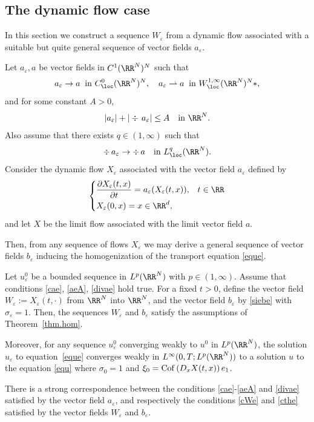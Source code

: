 \subsection{The dynamic flow case}\label{ss.flow}
In this section we construct a sequence $W_\varepsilon$ from a dynamic flow associated with a suitable but quite general sequence of vector fields $a_\varepsilon$.

Let $a_\varepsilon,a$ be vector fields in $C^1(\RR^N)^N$ such that
\begin{equation}\label{cae}
a_\varepsilon \to a\;\;\mbox{in }C^0_\loc(\RR^N)^N,\quad a_\varepsilon\rightharpoonup a\;\;\mbox{in }W^{1,\infty}_\loc(\RR^N)^N\ast,
\end{equation}
and for some constant $A>0$,
\begin{equation}\label{aeA}
|a_\varepsilon|+|\div\,a_\varepsilon|\leq A\quad\mbox{in }\RR^N.
\end{equation}
Also assume that there exists $q\in(1,\infty)$ such that
\begin{equation}\label{divae}
\div\,a_\varepsilon\to \div\,a\quad\mbox{in }L^q_\loc(\RR^N).
\end{equation}
Consider the dynamic flow $X_\varepsilon$ associated with the vector field $a_\varepsilon$ defined by
\begin{equation}\label{Xeae}
\begin{cases}
\dfrac{\partial X_\varepsilon(t,x)}{\partial t}=a_\varepsilon(X_\varepsilon(t,x)), & t\in\RR
\\[5pt]
X_\varepsilon(0,x)=x\in\RR^d,
\end{cases}
\end{equation}
and let $X$ be the limit flow associated with the limit vector field $a$.

Then, from any sequence of flows $X_\varepsilon$ we may derive a general sequence of vector fields $b_\varepsilon$ inducing the homogenization of the transport equation \eqref{eque}.
\begin{Pro}\label{pro.ae}
Let $u_\varepsilon^0$ be a bounded sequence in $L^p(\RR^N)$ with $p\in(1,\infty)$.
Assume that conditions \eqref{cae}, \eqref{aeA}, \eqref{divae} hold true. For a fixed $t>0$, define the vector field $W_\varepsilon:=X_\varepsilon(t,\cdot)$ from $\RR^N$ into $\RR^N$, and the vector field $b_\varepsilon$ by \eqref{siebe} with $\sigma_\varepsilon=1$. Then, the sequences $W_\varepsilon$ and $b_\varepsilon$ satisfy the assumptions of Theorem~\ref{thm.hom}.

Moreover, for any sequence $u_\varepsilon^0$ converging weakly to $u^0$ in $L^p(\RR^N)$, the solution $u_\varepsilon$ to equation~\eqref{eque} converges weakly in $L^\infty(0,T;L^p(\RR^N))$ to a solution $u$ to the equation \eqref{equ} where $\sigma_0=1$ and $\xi_0={\rm Cof}\,(D_x X(t,x))\,e_1$.
\end{Pro}
\begin{Rem}
There is a strong correspondence between the conditions \eqref{cae}-\eqref{aeA} and \eqref{divae} satisfied by the vector field $a_\varepsilon$, and respectively the conditions \eqref{cWe} and \eqref{cthe} satisfied by the vector fields $W_\varepsilon$ and $b_\varepsilon$.
\end{Rem}

